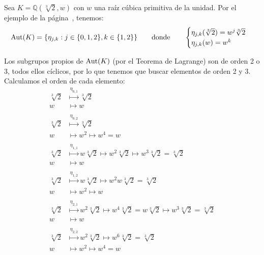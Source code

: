 \begin{ejemplo}\label{ejemplo:subcuerpos_fijos}
    Sea $K = \mathbb{Q}\left(\sqrt[3]{2},w\right)$ con $w$ una raíz cúbica primitiva de la unidad. Por el ejemplo de la página~\pageref{ejemplo:aut_sqrt3_2}, tenemos:
    \begin{equation*}
        \operatorname{Aut}(K) = \{\eta_{j,k} : j\in \{0,1,2\}, k \in \{1,2\}\}
        \qquad\text{donde}\qquad
        \begin{cases}
            \eta_{j,k}(\sqrt[3]{2}) = w^j \sqrt[3]{2} \\
            \eta_{j,k}(w) = w^k
        \end{cases}
    \end{equation*}

    Los subgrupos propios de $\operatorname{Aut}(K)$ (por el Teorema de Lagrange) son de orden 2 o 3, todos ellos cíclicos, por lo que tenemos que buscar elementos de orden 2 y 3. Calculamos el orden de cada elemento:
    \begin{align*}
        \sqrt[3]{2} &\stackrel{\eta_{0,1}}{\longmapsto} \sqrt[3]{2}\\
        w &\longmapsto w \\
        \\
        \sqrt[3]{2} &\stackrel{\eta_{0,2}}{\longmapsto} \sqrt[3]{2} \\
        w &\longmapsto w^2 \longmapsto w^4 = w \\
        \\
        \sqrt[3]{2} &\stackrel{\eta_{1,1}}{\longmapsto} w\sqrt[3]{2} \longmapsto w^2\sqrt[3]{2} \longmapsto w^3\sqrt[3]{2} = \sqrt[3]{2} \\
        w &\longmapsto w \\
        \\
        \sqrt[3]{2} &\stackrel{\eta_{1,2}}{\longmapsto} w\sqrt[3]{2} \longmapsto w^2 w\sqrt[3]{2} = \sqrt[3]{2} \\
        w &\longmapsto w^2 \longmapsto w \\
        \\
        \sqrt[3]{2} &\stackrel{\eta_{2,1}}{\longmapsto} w^2\sqrt[3]{2} \longmapsto w^4\sqrt[3]{2} = w\sqrt[3]{2} \longmapsto w^3\sqrt[3]{2} = \sqrt[3]{2} \\
        w &\longmapsto w \\
        \\
        \sqrt[3]{2} &\stackrel{\eta_{2,2}}{\longmapsto} w^2\sqrt[3]{2} \longmapsto w^6\sqrt[3]{2} = \sqrt[3]{2} \\
        w &\longmapsto w^2 \longmapsto w^4 = w
    \end{align*}


\end{ejemplo}
